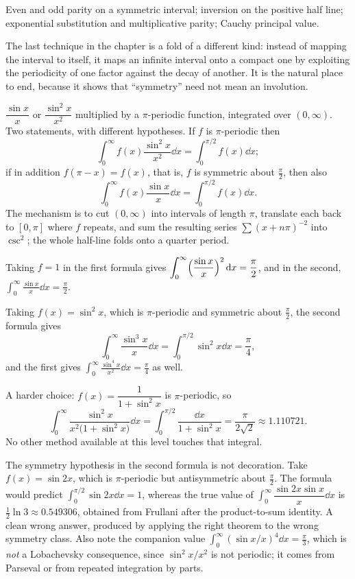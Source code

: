 \begin{seealsob}Even and odd parity on a symmetric interval; inversion on the positive half line; exponential substitution and multiplicative parity; Cauchy principal value.\end{seealsob}

The last technique in the chapter is a fold of a different kind: instead of mapping the interval to itself, it maps an infinite interval onto a compact one by exploiting the periodicity of one factor against the decay of another. It is the natural place to end, because it shows that ``symmetry'' need not mean an involution.

\cue $\dfrac{\sin x}{x}$ or $\dfrac{\sin^{2}x}{x^{2}}$ multiplied by a $\pi$-periodic function, integrated over $(0,\infty)$.
\method Two statements, with different hypotheses. If $f$ is $\pi$-periodic then
\[\int_0^{\infty}f(x)\frac{\sin^{2}x}{x^{2}}\dd x=\int_0^{\pi/2}f(x)\dd x;\]
if in addition $f(\pi-x)=f(x)$, that is, $f$ is symmetric about $\tfrac{\pi}{2}$, then also
\[\int_0^{\infty}f(x)\frac{\sin x}{x}\dd x=\int_0^{\pi/2}f(x)\dd x.\]
The mechanism is to cut $(0,\infty)$ into intervals of length $\pi$, translate each back to $[0,\pi]$ where $f$ repeats, and sum the resulting series $\sum(x+n\pi)^{-2}$ into $\csc^{2}$; the whole half-line folds onto a quarter period.

\begin{worked}
Taking $f=1$ in the first formula gives $\displaystyle\int_0^{\infty}\Bigl(\frac{\sin x}{x}\Bigr)^{2}\,\mathrm{d} x=\frac{\pi}{2}$, and in the second, $\displaystyle\int_0^{\infty}\frac{\sin x}{x}\dd x=\frac{\pi}{2}$.

Taking $f(x)=\sin^{2}x$, which is $\pi$-periodic and symmetric about $\tfrac{\pi}{2}$, the second formula gives
\[\int_0^{\infty}\frac{\sin^{3}x}{x}\dd x=\int_0^{\pi/2}\sin^{2}x\dd x=\frac{\pi}{4},\]
and the first gives $\displaystyle\int_0^{\infty}\frac{\sin^{4}x}{x^{2}}\dd x=\frac{\pi}{4}$ as well.

A harder choice: $f(x)=\dfrac{1}{1+\sin^{2}x}$ is $\pi$-periodic, so
\[\int_0^{\infty}\frac{\sin^{2}x}{x^{2}\bigl(1+\sin^{2}x\bigr)}\dd x=\int_0^{\pi/2}\frac{\dd x}{1+\sin^{2}x}=\frac{\pi}{2\sqrt2}\approx1.110721.\]
No other method available at this level touches that integral.
\end{worked}

\begin{trap}
The symmetry hypothesis in the second formula is not decoration. Take $f(x)=\sin2x$, which is $\pi$-periodic but antisymmetric about $\tfrac{\pi}{2}$. The formula would predict $\int_0^{\pi/2}\sin2x\dd x=1$, whereas the true value of $\int_0^{\infty}\dfrac{\sin2x\sin x}{x}\dd x$ is $\tfrac12\ln3\approx0.549306$, obtained from Frullani after the product-to-sum identity. A clean wrong answer, produced by applying the right theorem to the wrong symmetry class. Also note the companion value $\int_0^{\infty}(\sin x/x)^{4}\dd x=\tfrac{\pi}{3}$, which is \emph{not} a Lobachevsky consequence, since $\sin^{2}x/x^{2}$ is not periodic; it comes from Parseval or from repeated integration by parts.
\end{trap}

